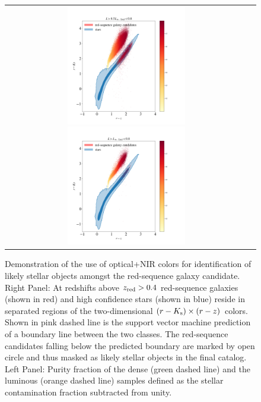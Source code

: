 \documentclass[fleqn,usenatbib,useAMS]{mnras}
\begin{document}
\begin{figure}
\begin{tabular}{cc}
\includegraphics[width=0.5\textwidth]{figures_tmp/red_vs_star_dense.png}
\includegraphics[width=0.5\textwidth]{figures_tmp/red_vs_star_lum.png}
\end{tabular}
\caption{\label{fig:star_galaxy_I} Demonstration of the use of optical+NIR colors for identification of likely stellar objects amongst the red-sequence galaxy candidate. Right Panel: At redshifts above $z_{\rm red}>0.4$ red-sequence galaxies (shown in red) and high confidence stars (shown in blue) reside in separated regions of the two-dimensional $(r-K_{\rm s}) \times (r-z)$ colors. Shown in pink dashed line is the support vector machine prediction of a boundary line between the two classes. The red-sequence candidates falling below the predicted boundary are marked by open circle and thus masked as likely stellar objects in the final catalog. Left Panel: Purity fraction of the dense  (green dashed line) and the luminous (orange dashed line) samples defined as the stellar contamination fraction subtracted from unity.} 
\end{figure}
\end{document}
